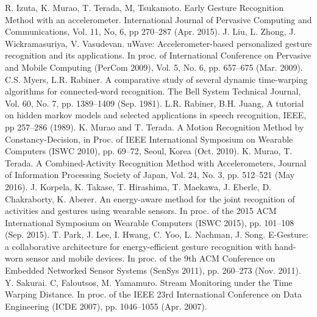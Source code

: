 \documentclass{sigchi-ext}
\begin{document}
        
        \begin{thebibliography}{99}
             R. Izuta, K. Murao, T. Terada, M, Tsukamoto. Early Gesture Recognition Method with an accelerometer. International Journal of Pervasive Computing and Communications, Vol. 11, No, 6, pp 270--287 (Apr. 2015).
             J. Liu, L. Zhong, J. Wickramasuriya, V. Vasudevan. uWave: Accelerometer-based personalized
            gesture recognition and its applications. In proc. of International Conference
            on Pervasive and Mobile Computing (PerCom 2009), Vol. 5, No. 6, pp. 657--675 (Mar.
            2009).
             C.S. Myers, L.R. Rabiner. A comparative study of several dynamic time-warping algorithms
            for connected-word recognition. The Bell System Technical Journal, Vol. 60,
            No. 7, pp. 1389--1409 (Sep. 1981).
             L.R. Rabiner, B.H. Juang, A tutorial on hidden markov models and selected applications in speech recognition, IEEE, pp 257--286 (1989).
             K. Murao and T. Terada. A Motion Recognition Method by Constancy-Decision, in Proc. of IEEE International Symposium on Wearable Computers (ISWC 2010), pp. 69--72, Seoul, Korea (Oct. 2010).
             K. Murao, T. Terada. A Combined-Activity Recognition Method with Accelerometers, Journal of Information Processing Society of Japan, Vol. 24, No. 3, pp. 512--521 (May 2016).
             J. Korpela, K. Takase, T. Hirashima, T. Maekawa, J. Eberle, D. Chakraborty, K. Aberer. An energy-aware method for the joint recognition of activities and gestures using wearable sensors. In proc. of the 2015 ACM International Symposium on Wearable Computers (ISWC  2015), pp. 101--108 (Sep. 2015).
             T. Park, J. Lee, I. Hwang, C. Yoo, L. Nachman, J. Song. E-Gesture: a collaborative architecture for energy-efficient gesture recognition with hand-worn sensor and mobile devices. In proc. of the 9th ACM Conference on Embedded Networked Sensor Systems (SenSys 2011), pp. 260--273 (Nov. 2011).
             Y. Sakurai. C, Faloutsos, M. Yamamuro. Stream
            Monitoring under the Time Warping Distance.  In proc. of the IEEE 23rd
            International Conference on Data Engineering (ICDE 2007), pp. 1046--1055 (Apr. 2007).
        \end{thebibliography}
    
\end{document}
